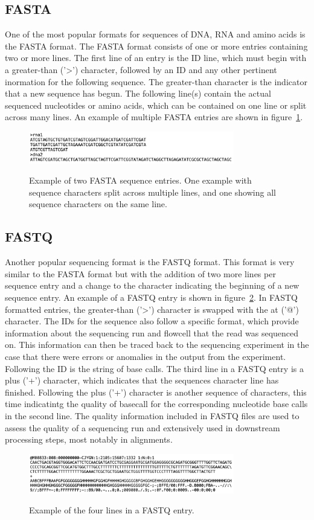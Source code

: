 \subsection{FASTA}
One of the most popular formats for sequences of DNA, RNA and amino
acids is the FASTA format. The FASTA format consists of one or more
entries containing two or more lines. The first line of an entry is
the ID line, which must begin with a greater-than ('>') character,
followed by an ID and any other pertinent inormation for the following
sequence. The greater-than character is the indicator that a new
sequence has begun. The following line(s) contain the actual sequenced
nucleotides or amino acids, which can be contained on one line or
split across many lines. An example of multiple FASTA entries are
shown in figure~\ref{fig:fasta-example}.

\begin{figure}
  \centering
  \includegraphics[width=0.8\textwidth]{figures/fasta-example.png}
  \label{fig:fasta-example}
  \caption{Example of two FASTA sequence entries. One example with
    sequence characters split across multiple lines, and one showing
    all sequence characters on the same line.}
\end{figure}

\subsection{FASTQ}
Another popular sequencing format is the FASTQ format. This format is
very similar to the FASTA format but with the addition of two more
lines per sequence entry and a change to the character indicating the
beginning of a new sequence entry. An example of a FASTQ entry is
shown in figure~\ref{fig:fastq-example}. In FASTQ formatted entries,
the greater-than ('>') character is swapped with the at ('@')
character. The IDs for the sequence also follow a specific format,
which provide information about the sequencing run and flowcell that
the read was sequenced on. This information can then be traced back to
the sequencing experiment in the case that there were errors or
anomalies in the output from the experiment. Following the ID is the
string of base calls. The third line in a FASTQ entry is a plus ('+')
character, which indicates that the sequences character line has
finished. Following the plus ('+') character is another sequence of
characters, this time indicatintg the quality of basecall for the
corresponding nucleotide base calls in the second line. The quality
information included in FASTQ files are used to assess the quality of
a sequencing run and extensively used in downstream processing steps,
most notably in alignments.

\begin{figure}
  \centering
  \includegraphics[width=0.8\textwidth]{figures/fastq-example.png}
  \label{fig:fastq-example}
  \caption{Example of the four lines in a FASTQ entry.}
\end{figure}
